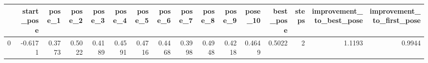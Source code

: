 \begin{tabular}{lrrrrrrrrrrrrrrr}
\toprule
{} &  start\_pose &  pose\_1 &  pose\_2 &  pose\_3 &  pose\_4 &  pose\_5 &  pose\_6 &  pose\_7 &  pose\_8 &  pose\_9 &  pose\_10 &  best\_pose &  steps &  improvement\_to\_best\_pose &  improvement\_to\_first\_pose \\
\midrule
0 &     -0.6171 &  0.3773 &  0.5022 &  0.4189 &  0.4591 &  0.4716 &  0.4468 &  0.3998 &  0.4948 &  0.4218 &   0.4649 &     0.5022 &      2 &                    1.1193 &                     0.9944 \\
\bottomrule
\end{tabular}
